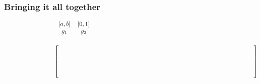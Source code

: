 \documentclass{beamer}
\def\w{\color{white}}
\begin{document}
\begin{frame}[shrink=25]
\frametitle{Bringing it all together}

    \begin{equation*}
        \begin{blockarray}{cccccccccc}
                               &                   & [a,b]             &
            [0,1]              &\w(-\infty,\infty) &\w(-\infty,\infty) &
            \w[0,1]            &\w(-\infty,\infty) & \w[0,1]           &
            \w(-\infty,\infty) \\ 
                               &                   & g_{1}             &
            g_{2}              & \w s_{1}          & \w s_{2}          &
            \w E_{f}^{1}       & \w E_{d}^{1}      & \w I_{f}^{1}      &
            \w I_{d}^{1}       \\
                               &                   &                   &
                               &                   &                   &
                               &                   &                   &
             \\ 
            \begin{block}{cc[cccccccc]}
            \w {(-\infty,0]}   & \w Rto_{m}        & \w -1             &
            \w m               &                   &                   &
                               &                   &                   &
             \\
            \w {[0,\infty)}    & \w Rto_{M}        & \w -1             &
            \w M               &                   &                   &
                               &                   &                   &
             \\
            \w {[-1,0]}        & \w E_{f}^{1}      &\w f_{g_{1}}^{E^{1}}&
            \w f_{g_{2}}^{E^{1}}&                   &                   &
            \w -1              &                   &                   &
             \\
            \w {[0,0]}         & \w E_{d}^{1}      &                   &
                               &\w f_{s_{1}}^{E^{1}}& \w f_{s_{2}}^{E^{1}}&
                               & \w -1             &                   &
             \\
            \w {[E_{c}^{1},E_{c}^{1}]} 
                               & \w E_{b}^{1}      &                   &
                               &                   &                   &
            \w 1               & \w -1             &                   &
             \\

\end{block}
\end{blockarray}
\end{equation*}
\end{frame}
\end{document}
